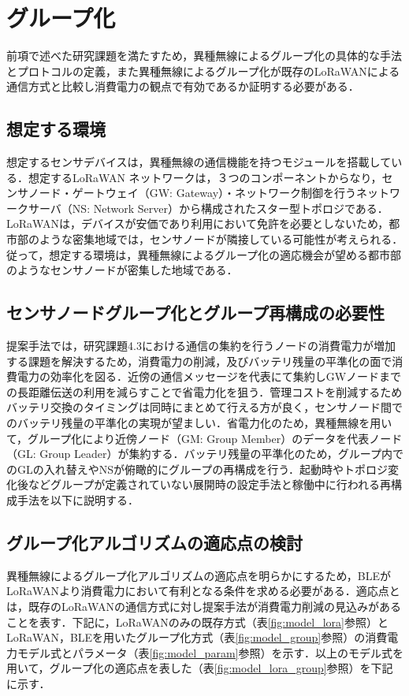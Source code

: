 \section{グループ化}
前項で述べた研究課題を満たすため，異種無線によるグループ化の具体的な手法とプロトコルの定義，また異種無線によるグループ化が既存のLoRaWANによる通信方式と比較し消費電力の観点で有効であるか証明する必要がある．

\subsection{想定する環境}
想定するセンサデバイスは，異種無線の通信機能を持つモジュールを搭載している．想定するLoRaWAN ネットワークは，３つのコンポーネントからなり，センサノード・ゲートウェイ（GW: Gateway）・ネットワーク制御を行うネットワークサーバ（NS: Network Server）から構成されたスター型トポロジである．LoRaWANは，デバイスが安価であり利用において免許を必要としないため，都市部のような密集地域では，センサノードが隣接している可能性が考えられる．従って，想定する環境は，異種無線によるグループ化の適応機会が望める都市部のようなセンサノードが密集した地域である．

\subsection{センサノードグループ化とグループ再構成の必要性}
提案手法では，研究課題4.3における通信の集約を行うノードの消費電力が増加する課題を解決するため，消費電力の削減，及びバッテリ残量の平準化の面で消費電力の効率化を図る．近傍の通信メッセージを代表にて集約しGWノードまでの長距離伝送の利用を減らすことで省電力化を狙う．管理コストを削減するためバッテリ交換のタイミングは同時にまとめて行える方が良く，センサノード間でのバッテリ残量の平準化の実現が望ましい．省電力化のため，異種無線を用いて，グループ化により近傍ノード（GM: Group Member）のデータを代表ノード（GL: Group Leader）が集約する．バッテリ残量の平準化のため，グループ内でのGLの入れ替えやNSが俯瞰的にグループの再構成を行う．起動時やトポロジ変化後などグループが定義されていない展開時の設定手法と稼働中に行われる再構成手法を以下に説明する．

\subsection{グループ化アルゴリズムの適応点の検討}
異種無線によるグループ化アルゴリズムの適応点を明らかにするため，BLEがLoRaWANより消費電力において有利となる条件を求める必要がある．適応点とは，既存のLoRaWANの通信方式に対し提案手法が消費電力削減の見込みがあることを表す．下記に，LoRaWANのみの既存方式（表\ref{fig:model_lora}参照）とLoRaWAN，BLEを用いたグループ化方式（表\ref{fig:model_group}参照）の消費電力モデル式とパラメータ（表\ref{fig:model_param}参照）を示す．以上のモデル式を用いて，グループ化の適応点を表した（表\ref{fig:model_lora_group}参照）を下記に示す．

